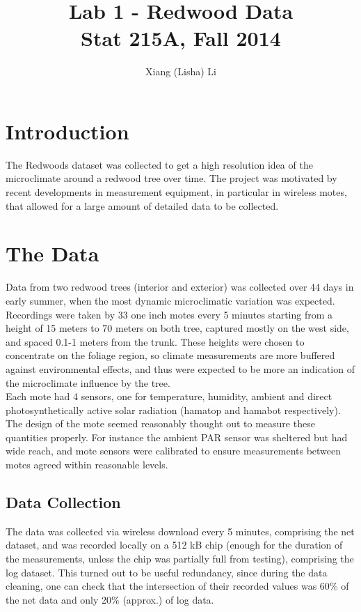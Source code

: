 \documentclass[english]{article}\usepackage[]{graphicx}\usepackage[]{color}
\begin{document}
\title{Lab 1 - Redwood Data\\
Stat 215A, Fall 2014}

\author{Xiang (Lisha) Li}

\maketitle

\section{Introduction}

The Redwoods dataset was collected to get a high resolution idea of the microclimate around a redwood tree over time. The project was motivated by recent developments in measurement equipment, in particular in wireless motes, that allowed for a large amount of detailed data to be collected. 

\section{The Data}
Data from two redwood trees (interior and exterior) was collected over 44 days in early summer, when the most dynamic microclimatic variation was expected. Recordings were taken by 33 one inch motes every 5 minutes starting from a height of 15 meters to 70 meters on both tree, captured mostly on the west side, and spaced 0.1-1 meters from the trunk.  These heights were chosen to concentrate on the foliage region, so climate measurements are more buffered against environmental effects, and thus were expected to be more an indication of the microclimate influence by the tree.  \\

Each mote had 4 sensors, one for temperature, humidity, ambient and direct photosynthetically active solar radiation (hamatop and hamabot respectively). The design of the mote seemed reasonably thought out to measure these quantities properly.  For instance the ambient PAR sensor was sheltered but had wide reach, and mote sensors were calibrated to ensure measurements between motes agreed within reasonable levels.

\subsection{Data Collection }

The data was collected via wireless download every 5 minutes, comprising the net dataset, and was recorded locally on a 512 kB chip (enough for the duration of the measurements, unless the chip was partially full from testing), comprising the log dataset. This turned out to be useful redundancy, since during the data cleaning, one can check that the intersection of their recorded values was 60\% of the net data and only 20\% (approx.) of log data.
\end{document}
